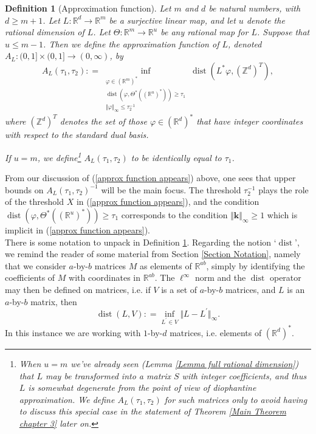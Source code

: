 \documentclass[12pt,a4paper,twoside,reqno]{amsart}
\newtheorem{Definition}[Theorem]{Definition}
\newcommand{\dist}{\operatorname{dist}}
\numberwithin{equation}{section}
\begin{document}
\begin{Definition}[Approximation function]
\label{Definition approximation function}
Let $m$ and $d$ be natural numbers, with $d\geqslant m+1$. Let $L:\mathbb{R}^d\longrightarrow \mathbb{R}^m$ be a surjective linear map, and let $u$ denote the rational dimension of $L$. Let $\Theta:\mathbb{R}^m\longrightarrow \mathbb{R}^u$ be any rational map for $L$. Suppose that $u\leqslant m-1$. Then we define the \emph{approximation function of $L$}, denoted $A_L:(0,1] \times (0,1]\longrightarrow (0,\infty)$, by \[ A_L(\tau_1,\tau_2) : = \inf\limits_{\substack{\varphi \in (\mathbb{R}^m)^*\\ \dist( \varphi, \Theta^*((\mathbb{R}^u)^*)) \geqslant \tau_1 \\  \Vert \varphi \Vert_\infty \leqslant \tau_2^{-1}} } \dist (L^* \varphi, (\mathbb{Z}^d)^T ),\] where $(\mathbb{Z}^d)^T$ denotes the set of those $\varphi \in (\mathbb{R}^d)^*$ that have integer coordinates with respect to the standard dual basis.

If $u = m$, we define\footnote{When $u=m$ we've already seen (Lemma \ref{Lemma full rational dimension}) that $L$ may be transformed into a matrix $S$ with integer coefficients, and thus $L$ is somewhat degenerate from the point of view of diophantine approximation. We define $A_L(\tau_1,\tau_2)$ for such matrices only to avoid having to discuss this special case in the statement of Theorem \ref{Main Theorem chapter 3} later on.} $A_L(\tau_1,\tau_2)$ to be identically equal to $\tau_1$. 
\end{Definition}
\noindent From our discussion of (\ref{approx function appears}) above, one sees that upper bounds on $A_L(\tau_1,\tau_2)^{-1}$ will be the main focus. The threshold $\tau_2^{-1}$ plays the role of the threshold $X$ in (\ref{approx function appears}), and the condition $\dist(\varphi, \Theta^*((\mathbb{R}^u)^*))\geqslant \tau_1$ corresponds to the condition $\Vert \mathbf{k}\Vert_\infty \geqslant 1$ which is implicit in (\ref{approx function appears}).\\

There is some notation to unpack in Definition \ref{Definition approximation function}. Regarding the notion `$\dist$', we remind the reader of some material from Section \ref{Section Notation}, namely that we consider $a$-by-$b$ matrices $M$ as elements of $\mathbb{R}^{ab}$, simply by identifying the coefficients of $M$ with coordinates in $\mathbb{R}^{ab}$. The $\ell^\infty$ norm and the $\operatorname{dist}$ operator may then be defined on matrices, i.e. if $V$ is a set of $a$-by-$b$ matrices, and $L$ is an $a$-by-$b$ matrix, then $$\operatorname{dist}(L,V): = \operatorname{inf}\limits_{L^\prime \in V} \Vert L - L^ \prime\Vert_\infty.$$ In this instance we are working with $1$-by-$d$ matrices, i.e. elements of $(\mathbb{R}^d)^*$. \\
\end{document}
